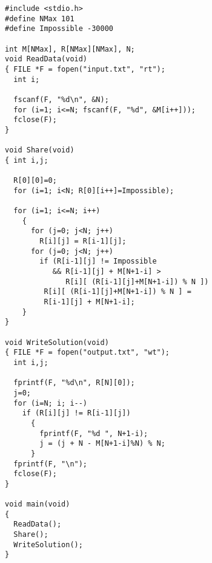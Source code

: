 \begin{verbatim}
#include <stdio.h>
#define NMax 101
#define Impossible -30000

int M[NMax], R[NMax][NMax], N;
void ReadData(void)
{ FILE *F = fopen("input.txt", "rt");
  int i;

  fscanf(F, "%d\n", &N);
  for (i=1; i<=N; fscanf(F, "%d", &M[i++]));
  fclose(F);
}

void Share(void)
{ int i,j;

  R[0][0]=0;
  for (i=1; i<N; R[0][i++]=Impossible);

  for (i=1; i<=N; i++)
    {
      for (j=0; j<N; j++)
        R[i][j] = R[i-1][j];
      for (j=0; j<N; j++)
        if (R[i-1][j] != Impossible
           && R[i-1][j] + M[N+1-i] > 
              R[i][ (R[i-1][j]+M[N+1-i]) % N ])
         R[i][ (R[i-1][j]+M[N+1-i]) % N ] =
         R[i-1][j] + M[N+1-i];
    }
}

void WriteSolution(void)
{ FILE *F = fopen("output.txt", "wt");
  int i,j;

  fprintf(F, "%d\n", R[N][0]);
  j=0;
  for (i=N; i; i--)
    if (R[i][j] != R[i-1][j])
      {
        fprintf(F, "%d ", N+1-i);
        j = (j + N - M[N+1-i]%N) % N;
      }
  fprintf(F, "\n");
  fclose(F);
}

void main(void)
{
  ReadData();
  Share();
  WriteSolution();
}
\end{verbatim}
